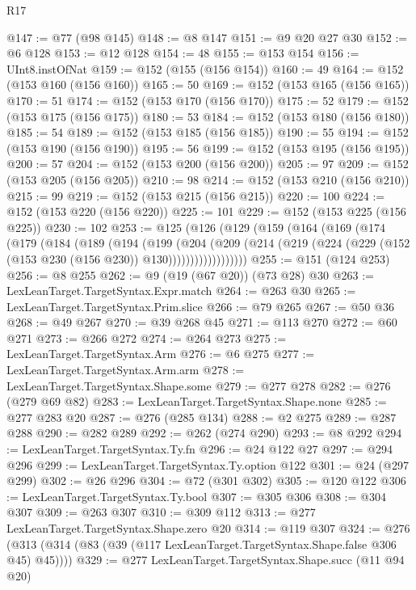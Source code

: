 \begin{lexlean}{R17}
\begin{coremodule}
@147 := @77 (@98 @145)
@148 := @8 @147
@151 := @9 @20 @27 @30
@152 := @6 @128
@153 := @12 @128
@154 := 48
@155 := @153 @154
@156 := UInt8.instOfNat
@159 := @152 (@155 (@156 @154))
@160 := 49
@164 := @152 (@153 @160 (@156 @160))
@165 := 50
@169 := @152 (@153 @165 (@156 @165))
@170 := 51
@174 := @152 (@153 @170 (@156 @170))
@175 := 52
@179 := @152 (@153 @175 (@156 @175))
@180 := 53
@184 := @152 (@153 @180 (@156 @180))
@185 := 54
@189 := @152 (@153 @185 (@156 @185))
@190 := 55
@194 := @152 (@153 @190 (@156 @190))
@195 := 56
@199 := @152 (@153 @195 (@156 @195))
@200 := 57
@204 := @152 (@153 @200 (@156 @200))
@205 := 97
@209 := @152 (@153 @205 (@156 @205))
@210 := 98
@214 := @152 (@153 @210 (@156 @210))
@215 := 99
@219 := @152 (@153 @215 (@156 @215))
@220 := 100
@224 := @152 (@153 @220 (@156 @220))
@225 := 101
@229 := @152 (@153 @225 (@156 @225))
@230 := 102
@253 := @125
    (@126
      (@129
        (@159
          (@164
            (@169
              (@174
                (@179
                  (@184
                    (@189
                      (@194
                        (@199
                          (@204
                            (@209
                              (@214
                                (@219
                                  (@224 (@229 (@152 (@153 @230 (@156 @230)) @130))))))))))))))))))
@255 := @151 (@124 @253)
@256 := @8 @255
@262 := @9 (@19 (@67 @20)) (@73 @28) @30
@263 := LexLeanTarget.TargetSyntax.Expr.match
@264 := @263 @30
@265 := LexLeanTarget.TargetSyntax.Prim.slice
@266 := @79 @265
@267 := @50 @36
@268 := @49 @267
@270 := @39 @268 @45
@271 := @113 @270
@272 := @60 @271
@273 := @266 @272
@274 := @264 @273
@275 := LexLeanTarget.TargetSyntax.Arm
@276 := @6 @275
@277 := LexLeanTarget.TargetSyntax.Arm.arm
@278 := LexLeanTarget.TargetSyntax.Shape.some
@279 := @277 @278
@282 := @276 (@279 @69 @82)
@283 := LexLeanTarget.TargetSyntax.Shape.none
@285 := @277 @283 @20
@287 := @276 (@285 @134)
@288 := @2 @275
@289 := @287 @288
@290 := @282 @289
@292 := @262 (@274 @290)
@293 := @8 @292
@294 := LexLeanTarget.TargetSyntax.Ty.fn
@296 := @24 @122 @27
@297 := @294 @296
@299 := LexLeanTarget.TargetSyntax.Ty.option @122
@301 := @24 (@297 @299)
@302 := @26 @296
@304 := @72 (@301 @302)
@305 := @120 @122
@306 := LexLeanTarget.TargetSyntax.Ty.bool
@307 := @305 @306
@308 := @304 @307
@309 := @263 @307
@310 := @309 @112
@313 := @277 LexLeanTarget.TargetSyntax.Shape.zero @20
@314 := @119 @307
@324 := @276 (@313 (@314 (@83 (@39 (@117 LexLeanTarget.TargetSyntax.Shape.false @306 @45) @45))))
@329 := @277 LexLeanTarget.TargetSyntax.Shape.succ (@11 @94 @20)

\end{coremodule}
\end{lexlean}
